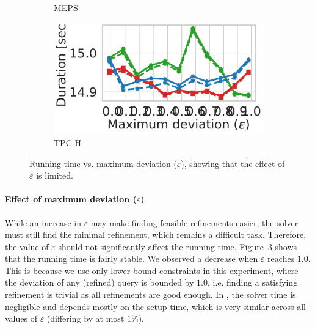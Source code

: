 \begin{figure}[t]
\begin{subfigure}{.35\textwidth}
      \caption{MEPS}
      \label{fig:r11}
    \end{subfigure}
    \begin{subfigure}{.35\textwidth}
      \centering
      \includegraphics[width=.75\linewidth]{figures/tpch_eps.pdf}
      \caption{TPC-H}
      \label{fig:r12}
    \end{subfigure}
    
    \caption{Running time vs. maximum deviation ($\varepsilon$), showing that the effect of $\varepsilon$ is limited.}
    \label{fig:time_vs_eps}
\end{figure}
\paragraph*{\textbf{Effect of maximum deviation ($\varepsilon$)}}
\label{sec:time_vs_eps}
While an increase in $\varepsilon$ may make finding feasible refinements easier, the solver must still find the minimal refinement, which remains a difficult task. Therefore, the value of $\varepsilon$ should not significantly affect the running time. Figure~\ref{fig:time_vs_eps} shows that the running time is fairly stable. We observed a decrease when $\varepsilon$ reaches $1.0$. This is because we use only lower-bound constraints in this experiment, where the deviation of any (refined) query is bounded by $1.0$, i.e. finding a satisfying refinement is trivial as all refinements are good enough.
In , 
the solver time is negligible and depends mostly on the setup time, which is very similar across all values of $\varepsilon$ (differing by at most $1\%$).



